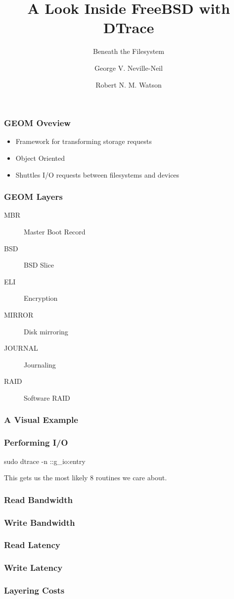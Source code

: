 \documentclass[pdftex]{beamer}
\begin{document}

\title{A Look Inside FreeBSD with DTrace}
\subtitle{Beneath the Filesystem}
\author[shortname]{George V. Neville-Neil \and Robert N. M. Watson}

\begin{frame}
  \frametitle{GEOM Oveview}
  \begin{itemize}
  \item Framework for transforming storage requests
  \item Object Oriented
  \item Shuttles I/O requests between filesystems and devices
  \end{itemize}
\end{frame}

\begin{frame}
  \frametitle{GEOM Layers}
  \begin{description}
  \item[MBR] Master Boot Record
  \item[BSD] BSD Slice
  \item[ELI] Encryption
  \item[MIRROR] Disk mirroring
  \item[JOURNAL] Journaling
  \item[RAID] Software RAID
\end{description}
\end{frame}

\begin{frame}
  \frametitle{A Visual Example}
  
\end{frame}

\begin{frame}
  \frametitle{Performing I/O}
sudo dtrace -n ::g\_io\*:entry  

This gets us the most likely 8 routines we care about.

\end{frame}

\begin{frame}
  \frametitle{Read Bandwidth}
  
\end{frame}

\begin{frame}
  \frametitle{Write Bandwidth}
  
\end{frame}

\begin{frame}
  \frametitle{Read Latency}
  
\end{frame}

\begin{frame}
  \frametitle{Write Latency}
  
\end{frame}

\begin{frame}
  \frametitle{Layering Costs}
  
\end{frame}

\end{document}

